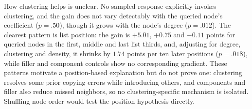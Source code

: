 \documentclass[11pt]{article}
\begin{document}
How clustering helps is unclear. No sampled response explicitly invokes clustering, and the gain does not vary detectably with the queried node's coefficient ($p=.50$), though it grows with the node's degree ($p=.012$). %
The clearest pattern is list position: the gain is $+5.01$, $+0.75$ and $-0.11$ points for queried nodes in the first, middle and last list thirds, and, adjusting for degree, clustering and density, it shrinks by $1.74$ points per ten later positions ($p=.018$), while filler and component controls show no corresponding gradient. %
These patterns motivate a position-based explanation but do not prove one: clustering resolves some prior copying errors while introducing others, and components and filler also reduce missed neighbors, so no clustering-specific mechanism is isolated. Shuffling node order would test the position hypothesis directly. %
\end{document}

